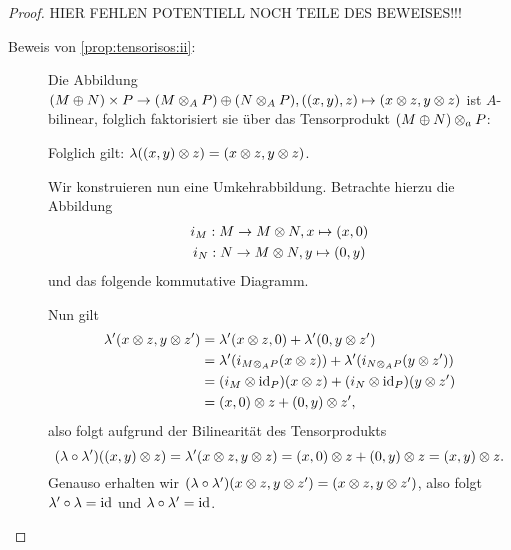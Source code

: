 \documentclass[12pt,a4paper]{scrartcl}
\theoremstyle{cplain}
\theoremstyle{cdef}
\begin{document}
\begin{proof}
	HIER FEHLEN POTENTIELL NOCH TEILE DES BEWEISES!!!
	\begin{description}
		\item[Beweis von \ref{prop:tensorisos:ii}:] Die Abbildung $(M\oplus N)\times P \to (M\otimes_AP) \oplus(N\otimes_AP), ((x,y),z)\mapsto (x\otimes z, y\otimes z)$ ist $A$-bilinear, folglich faktorisiert sie über das Tensorprodukt $(M\oplus N)\otimes_aP$:
		\begin{figure}[H]
			\centering
		\end{figure}
		Folglich gilt: $\lambda((x,y)\otimes z) = (x\otimes z, y\otimes z)$.

		Wir konstruieren nun eine Umkehrabbildung. Betrachte hierzu die Abbildung
		\begin{gather*}
			i_M: M \to M \otimes N, x \mapsto (x,0) \\
			i_N : N \to M \otimes N, y \mapsto (0,y)
		\end{gather*}
		und das folgende kommutative Diagramm.
		\begin{figure}[H]
			\centering
		\end{figure}
		Nun gilt
		\begin{align*}
			\lambda'(x \otimes z, y \otimes z') &= \lambda'(x \otimes z,0)+ \lambda'(0,y \otimes z') \\
			&= \lambda'(i_{M \otimes_A P}(x \otimes z))+ \lambda'(i_{N \otimes_A P}(y \otimes z')) \\
			&= (i_M \otimes \operatorname{id}_P)(x \otimes z) + (i_N \otimes \operatorname{id}_P)(y \otimes z') \\
			&= (x,0) \otimes z + (0,y) \otimes z',
		\end{align*}
		also folgt aufgrund der Bilinearität des Tensorprodukts \[ (\lambda \circ \lambda')((x,y)\otimes z) = \lambda'(x \otimes z, y \otimes z) = (x,0) \otimes z + (0,y) \otimes z = (x,y)\otimes z .\]
		Genauso erhalten wir $(\lambda \circ \lambda')(x \otimes z,y \otimes z') = (x\otimes z, y \otimes z')$, also folgt $\lambda' \circ \lambda = \operatorname{id}$ und $\lambda \circ \lambda' = \operatorname{id}$.
		\qedhere
	\end{description}
\end{proof}
\end{document}
